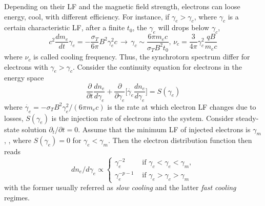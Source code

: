 %
%
Depending on their \ac{LF} and the magnetic field strength, electrons can loose 
energy, cool, with different efficiency. For instance, if $\gamma_e > \gamma_c$,
where $\gamma_c$ is a certain characteristic \ac{LF}, after a finite $t_0$, the 
$\gamma_e$ will drops below $\gamma_c$, 
%
\begin{equation}
c^2 \frac{dm_e}{dt} \gamma_e = -\frac{\sigma_T}{6\pi} B^2 \gamma_e^2 c 
\, \rightarrow\, 
\gamma_c \sim \frac{6 \pi m_e c}{\sigma_T B^2 t_0}, \,
\nu_c = \frac{3}{4\pi} \gamma_c^2 \frac{q B}{m_e c}
\end{equation}
%
where $\nu_c$ is called cooling frequency. 
%
Thus, the synchrotorn spectrum differ for electrons with $\gamma_e > \gamma_c$.
%
Consider the continuity equation for electrons in the energy space 
%
\begin{equation}
\frac{\partial }{\partial t}\frac{d n_e}{d\gamma_e} + \frac{\partial}{\partial \gamma_e}\Big[ \dot{\gamma_e}\frac{dn_e}{d\gamma_e} \Big] = S(\gamma_e)
\end{equation}
%
where $\dot{\gamma_e} = -\sigma_T B^2 \gamma_e^2 / (6\pi m_e c)$ is the rate at 
which electron \ac{LF} changes due to losses, $S(\gamma_e)$ is the injection 
rate of electrons into the system.
%
Consider steady-state solution $\partial_t/\partial t = 0$.
%
Assume that the minimum \ac{LF} of injected electrons is $\gamma_m$, \eg, 
where $S(\gamma_e) = 0$ for $\gamma_e < \gamma_m$.
%
Then the electron distribution function then reads
%
\begin{equation}
    dn_e/d\gamma_e \propto 
    \begin{cases}
        \gamma_e^{-2} &\text{ if } \gamma_c < \gamma_e < \gamma_m, \\
        \gamma_e^{-p-1} &\text{ if } \gamma_e > \gamma_c > \gamma_m
    \end{cases}
    \label{eq:afterglow:elec_dist}
\end{equation}
%
with the former usually referred as \textit{slow cooling} and the latter
\textit{fast cooling} regimes.


